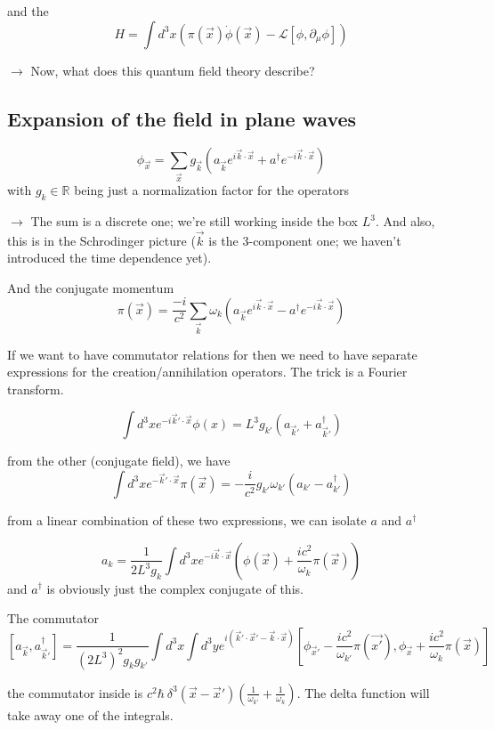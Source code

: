 \documentclass[11pt]{article}
\newcommand{\lag}{\mathcal{L}}
\begin{document}
			and the \[ H = \int d^3x \left( \pi(\vec{x})\dot{\phi}(\vec{x}) - \lag[\phi, \partial_\mu\phi] \right)\]
			
			$\rightarrow$ Now, what does this quantum field theory describe?
			
			\subsection*{Expansion of the field in plane waves}
			\[ \phi_{\vec{x}} = \sum_{\vec{x}} g_{\vec{k}} \left( a_{\vec{k}} e^{i\vec{k}\cdot\vec{x}} + a^\dagger e^{-i\vec{k}\cdot\vec{x}} \right)\]
			with $g_{k} \in \mathbb{R}$ being just a normalization factor for the operators
			
				
			$\rightarrow$ The sum is a discrete one; we're still working inside the box $L^3$. And also, this is in the Schrodinger picture ($\vec{k}$ is the 3-component one; we haven't introduced the time dependence yet).

			And the conjugate momentum \[ \pi(\vec{x}) = \frac{-i}{c^2}\sum_{\vec{k}} \omega_k \left( a_{\vec{k}} e^{i\vec{k}\cdot\vec{x}} - a^\dagger e^{-i\vec{k}\cdot\vec{x}} \right) \]
			
			If we want to have commutator relations for then we need to have separate expressions for the creation/annihilation operators. The trick is a Fourier transform. 
			
			\[ \int d^3x e^{-i\vec{k}'\cdot\vec{x}} \phi(x) = L^3 g_{k'} \left( a_{\vec{k}'} + a_{\vec{k}'}^\dagger \right)\]
			
			from the other (conjugate field), we have 
			\[ \int d^3 x e^{-\vec{k}'\cdot \vec{x}}\pi(\vec{x}) = -\frac{i}{c^2} g_{k'}\omega_{k'} \left(a_{k'} - a_{k'}^\dagger\right)\]
			
			from a linear combination of these two expressions, we can isolate $a$ and $a^\dagger$
			
			\[ a_k = \frac{1}{2L^3 g_k} \int d^3 x e^{-i\vec{k}\cdot \vec{x}} \left( \phi(\vec{x}) + \frac{ic^2}{\omega_k}\pi(\vec{x}) \right)\] and $a^\dagger$ is obviously just the complex conjugate of this.
			
			The commutator \[ [a_{\vec{k}} , a_{\vec{k}'}^\dagger] = \frac{1}{(2L^3)^2 g_k g_{k'}} \int d^3 x \int d^3 y e^{i(\vec{k}'\cdot \vec{x}' - \vec{k}\cdot \vec{x} )} \left[ \phi_{\vec{x}'} - \frac{ic^2}{\omega_{k'}}\pi(\vec{x'}) , \phi_{\vec{x}} + \frac{ic^2}{\omega_{k}}\pi(\vec{x})\right] \]
			
			the commutator inside is $ c^2 \hbar\ \delta^3(\vec{x}- \vec{x}') \left(\frac{1}{\omega_{k'}} + \frac{1}{\omega_{k}}\right)$. The delta function will take away one of the integrals.
			
\end{document}

